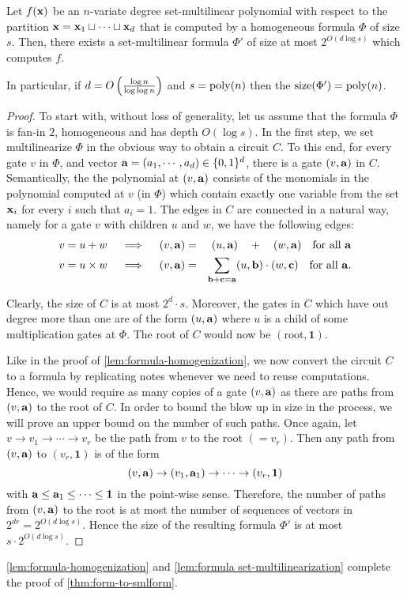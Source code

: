 \begin{lemma}\label{lem:formula set-multilinearization}
  Let $f(\mathbf{x})$ be an $n$-variate degree set-multilinear polynomial with respect to the partition $\mathbf{x} = \mathbf{x}_1\sqcup \cdots \sqcup \mathbf{x}_d$ that is computed by a homogeneous formula $\Phi$ of size $s$.
Then, there exists a set-multilinear formula $\Phi'$ of size at most $2^{O(d\log s)}$ which computes $f$.

In particular, if $d = O\left(\frac{\log n}{\log \log n}\right)$ and $s = \operatorname{poly}(n)$ then the $\mathrm{size}(\Phi') = \operatorname{poly}(n)$.  
\end{lemma}
\begin{proof}
To start with, without loss of generality, let us assume that the formula $\Phi$ is fan-in $2$, homogeneous and has depth $O(\log s)$.
In the first step, we set multilinearize $\Phi$ in the obvious way to obtain a circuit $C$.
To this end, for every gate $v$ in $\Phi$, and vector $\mathbf{a} = (a_1,\cdots, a_d) \in \{0,1\}^d$, there is a gate $(v, \mathbf{a})$ in $C$.
Semantically, the the polynomial at $(v,\mathbf{a})$ consists of the monomials in the polynomial computed at $v$ (in $\Phi$) which contain exactly one variable from the set $\mathbf{x}_i$ for every $i$ such that $a_i = 1$.
The edges in $C$ are connected in a natural way, namely for a gate $v$ with children $u$ and $w$, we have the following edges:
\begin{eqnarray*}
\text{$v = u + w$}\quad\implies\quad (v, \mathbf{a}) &=& (u, \mathbf{a}) \quad + \quad (w, \mathbf{a})\quad\text{for all $\mathbf{a}$}\\
\text{$v = u \times w$}\quad\implies\quad (v, \mathbf{a}) &=& \sum_{\mathbf{b} + \mathbf{c} = \mathbf{a}} (u, \mathbf{b})\cdot (w, \mathbf{c}) \quad\text{for all $\mathbf{a}$}.
\end{eqnarray*}
 
Clearly, the size of $C$ is at most $2^d\cdot s$.
Moreover, the gates in $C$ which have out degree more than one are of the form $(u,\mathbf{a})$ where $u$ is a child of some multiplication gates at $\Phi$. 
The root of $C$ would now be $(\text{root},\mathbf{1})$. 

Like in the proof of \autoref{lem:formula-homogenization}, we now convert the circuit $C$ to a formula by replicating notes whenever we need to reuse computations.
Hence, we would require as many copies of a gate $(v, \mathbf{a})$ as there are paths from $(v,\mathbf{a})$ to the root of $C$.
In order to bound the blow up in size in the process, we will prove an upper bound on the number of such paths.
Once again, let $v \rightarrow v_1 \rightarrow \cdots \rightarrow v_r$ be the path from $v$ to the root $(=v_r)$.
Then any path from $(v,\mathbf{a})$ to $(v_r,\mathbf{1})$ is of the form
\[
(v,\mathbf{a}) \rightarrow (v_1,\mathbf{a}_1) \rightarrow \cdots \rightarrow (v_r,\mathbf{1})
\]
with $\mathbf{a} \leq \mathbf{a}_1 \leq \cdots \leq \mathbf{1}$ in the point-wise sense.
Therefore, the number of paths from $(v,\mathbf{a})$ to the root is at most the number of sequences of vectors in $2^{dr} = 2^{O(d\log s)}$.
Hence the size of the resulting formula $\Phi'$ is at most $s \cdot 2^{O(d \log s)}$. 
\end{proof}

\autoref{lem:formula-homogenization} and \autoref{lem:formula set-multilinearization} complete the proof of \autoref{thm:form-to-smlform}. 




